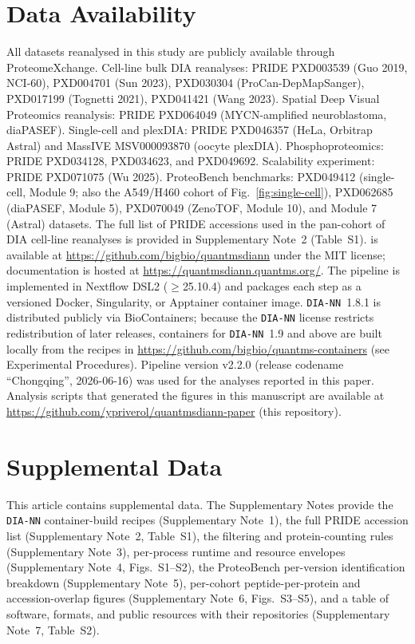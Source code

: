 \documentclass[preprint,12pt]{elsarticle}
\begin{document}

\section*{Data Availability}
All datasets reanalysed in this study are publicly available through ProteomeXchange.
Cell-line bulk DIA reanalyses: PRIDE PXD003539 (Guo 2019, NCI-60), PXD004701 (Sun 2023), PXD030304 (ProCan-DepMapSanger), PXD017199 (Tognetti 2021), PXD041421 (Wang 2023). Spatial Deep Visual Proteomics reanalysis: PRIDE PXD064049 (MYCN-amplified neuroblastoma, diaPASEF). Single-cell and plexDIA: PRIDE PXD046357 (HeLa, Orbitrap Astral) and MassIVE MSV000093870 (oocyte plexDIA). Phosphoproteomics: PRIDE PXD034128, PXD034623, and PXD049692.
Scalability experiment: PRIDE PXD071075 (Wu 2025). ProteoBench benchmarks: PXD049412 (single-cell, Module 9; also the A549/H460 cohort of Fig.~\ref{fig:single-cell}), PXD062685 (diaPASEF, Module 5), PXD070049 (ZenoTOF, Module 10), and Module 7 (Astral) datasets. The full list of PRIDE accessions used in the pan-cohort of DIA cell-line reanalyses is provided in Supplementary Note~2 (Table~S1). \quantmsdiann{} is available at \url{https://github.com/bigbio/quantmsdiann} under the MIT license; documentation is hosted at \url{https://quantmsdiann.quantms.org/}.
The pipeline is implemented in Nextflow DSL2 ($\geq$25.10.4) and packages each step as a versioned Docker, Singularity, or Apptainer container image. \texttt{DIA-NN}~1.8.1 is distributed publicly via BioContainers; because the \texttt{DIA-NN} license restricts redistribution of later releases, containers for \texttt{DIA-NN}~1.9 and above are built locally from the recipes in \url{https://github.com/bigbio/quantms-containers} (see Experimental Procedures). Pipeline version v2.2.0 (release codename ``Chongqing'', 2026-06-16) was used for the analyses reported in this paper. Analysis scripts that generated the figures in this manuscript are available at \url{https://github.com/ypriverol/quantmsdiann-paper} (this repository).

\section*{Supplemental Data}
This article contains supplemental data.
The Supplementary Notes provide the \texttt{DIA-NN} container-build recipes (Supplementary Note~1), the full PRIDE accession list (Supplementary Note~2, Table~S1), the filtering and protein-counting rules (Supplementary Note~3), per-process runtime and resource envelopes (Supplementary Note~4, Figs.~S1--S2), the ProteoBench per-version identification breakdown (Supplementary Note~5), per-cohort peptide-per-protein and accession-overlap figures (Supplementary Note~6, Figs.~S3--S5), and a table of software, formats, and public resources with their repositories (Supplementary Note~7, Table~S2).
\end{document}
